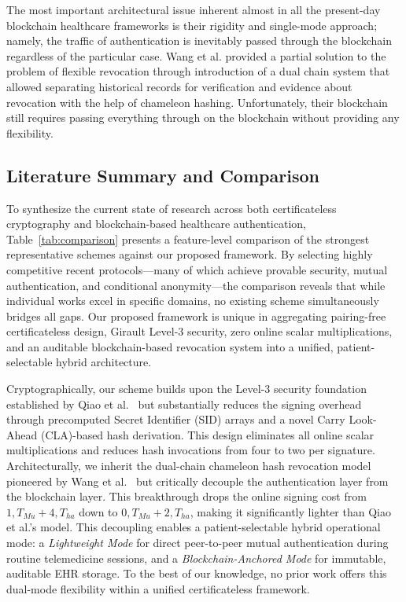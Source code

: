 \documentclass[conference]{IEEEtran}
\begin{document}
The most important architectural issue inherent almost in all the present-day blockchain healthcare frameworks is their rigidity and single-mode approach; namely, the traffic of authentication is inevitably passed through the blockchain regardless of the particular case. Wang et al. \cite{ref1} provided a partial solution to the problem of flexible revocation through introduction of a dual chain system that allowed separating historical records for verification and evidence about revocation with the help of chameleon hashing. Unfortunately, their blockchain still requires passing everything through on the blockchain without providing any flexibility.


\subsection{Literature Summary and Comparison}

To synthesize the current state of research across both certificateless cryptography and blockchain-based healthcare authentication, Table~\ref{tab:comparison} presents a feature-level comparison of the strongest representative schemes against our proposed framework. By selecting highly competitive recent protocols—many of which achieve provable security, mutual authentication, and conditional anonymity—the comparison reveals that while individual works excel in specific domains, no existing scheme simultaneously bridges all gaps. Our proposed framework is unique in aggregating pairing-free certificateless design, Girault Level-3 security, zero online scalar multiplications, and an auditable blockchain-based revocation system into a unified, patient-selectable hybrid architecture.

Cryptographically, our scheme builds upon the Level-3 security foundation established by Qiao et al.~\cite{ref24} but substantially reduces the signing overhead through precomputed Secret Identifier (SID) arrays and a novel Carry Look-Ahead (CLA)-based hash derivation. This design eliminates all online scalar multiplications and reduces hash invocations from four to two per signature. Architecturally, we inherit the dual-chain chameleon hash revocation model pioneered by Wang et al.~\cite{ref1} but critically decouple the authentication layer from the blockchain layer.  This breakthrough drops the online signing cost from $1,T_{Mu} + 4,T_{ha}$ down to $0,T_{Mu} + 2,T_{ha}$, making it significantly lighter than Qiao et al.'s model. This decoupling enables a patient-selectable hybrid operational mode: a \textit{Lightweight Mode} for direct peer-to-peer mutual authentication during routine telemedicine sessions, and a \textit{Blockchain-Anchored Mode} for immutable, auditable EHR storage. To the best of our knowledge, no prior work offers this dual-mode flexibility within a unified certificateless framework.
\end{document}
